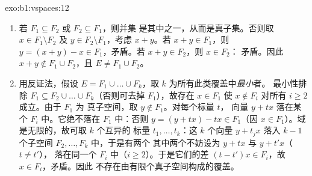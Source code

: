 \begin{solution}{exo:b1:vspaces:12}
\begin{enumerate}
  \item 若 $F_1 \subseteq F_2$ 或 $F_2 \subseteq F_1$，则并集
        是其中之一，从而是真子集。否则取 $x \in F_1
        \setminus F_2$ 及 $y \in F_2 \setminus F_1$，考虑
        $x + y$。若 $x + y \in F_1$，则 $y = (x + y) - x \in
        F_1$，矛盾。若 $x + y \in F_2$，则 $x \in F_2$：
        矛盾。因此 $x + y \notin F_1 \cup F_2$，且 $E \neq
        F_1 \cup F_2$。
  \item 用反证法，假设 $E = F_1 \cup \dots \cup
        F_k$，取 $k$ 为所有此类覆盖中\emph{最小}者。
        最小性排除 $F_1 \subseteq F_2 \cup
        \dots \cup F_k$（否则可去掉 $F_1$），故存在 $x \in F_1$
        使 $x \notin F_i$ 对所有 $i \geq 2$ 成立。由于 $F_1$ 为
        真子空间，取 $y \notin F_1$。对每个标量 $t$，
        向量 $y + t x$ 落在某个 $F_i$ 中。它绝不落在
        $F_1$ 中：否则 $y = (y + tx) - tx \in F_1$（因 $x \in
        F_1$）。域是无限的，故可取 $k$ 个互异的
        标量 $t_1, \dots, t_k$：这 $k$ 个向量 $y + t_j x$
        落入 $k - 1$ 个子空间 $F_2, \dots, F_k$ 中，于是有两个
        其中两个不妨设为 $y + t x$ 与 $y + t' x$（$t \neq t'$），
        落在同一个 $F_i$ 中（$i \geq 2$）。于是它们的差
        $(t - t')x \in F_i$，故 $x \in F_i$，矛盾。因此
        不存在由有限个真子空间构成的覆盖。
\end{enumerate}
\end{solution}

